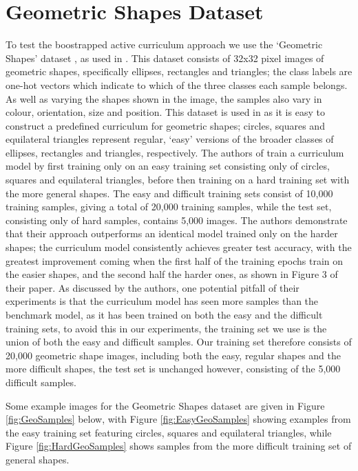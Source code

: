 \section{Geometric Shapes Dataset}\label{sec:GeoShapes}
To test the boostrapped active curriculum approach we use the `Geometric Shapes' dataset \cite{GeoShapes}, as used in \cite{Bengio2009}. This dataset consists of 32x32 pixel images of geometric shapes, specifically ellipses, rectangles and triangles; the class labels are one-hot vectors which indicate to which of the three classes each sample belongs. As well as varying the shapes shown in the image, the samples also vary in colour, orientation, size and position. This dataset is used in \cite{Bengio2009} as it is easy to construct a predefined curriculum for geometric shapes; circles, squares and equilateral triangles represent regular, `easy' versions of the broader classes of ellipses, rectangles and triangles, respectively. The authors of \cite{Bengio2009} train a curriculum model by first training only on an easy training set consisting only of circles, squares and equilateral triangles, before then training on a hard training set with the more general shapes. The easy and difficult training sets consist of 10,000 training samples, giving a total of 20,000 training samples, while the test set, consisting only of hard samples, contains 5,000 images. The authors demonstrate that their approach outperforms an identical model trained only on the harder shapes; the curriculum model consistently achieves greater test accuracy, with the greatest improvement coming  when the first half of the training epochs train on the easier shapes, and the second half the harder ones, as shown in Figure 3 of their paper. As discussed by the authors, one potential pitfall of their experiments is that the curriculum model has seen more samples than the benchmark model, as it has been trained on both the easy and the difficult training sets, to avoid this in our experiments, the training set we use is the union of both the easy and difficult samples. Our training set therefore consists of 20,000 geometric shape images, including both the easy, regular shapes and the more difficult shapes, the test set is unchanged however, consisting of the 5,000 difficult samples. 

Some example images for the Geometric Shapes dataset are given in Figure \ref{fig:GeoSamples} below, with Figure \ref{fig:EasyGeoSamples} showing examples from the easy training set featuring circles, squares and equilateral triangles, while Figure \ref{fig:HardGeoSamples} shows samples from the more difficult training set of general shapes.

